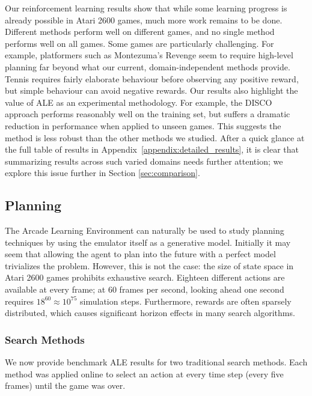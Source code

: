 \documentclass[twoside,11pt]{article}
\newcommand{\gamename}[1]{{\sc #1}}
\begin{document}
Our reinforcement learning results show that while some learning progress is already possible in Atari 2600 games, much more work remains to be done. 
Different methods perform well on different games, and no single method performs well on all games. 
Some games are particularly challenging.  For example, platformers such as \gamename{Montezuma's Revenge} seem to require high-level planning far beyond what our current, domain-independent methods provide.  \gamename{Tennis} requires fairly elaborate behaviour before observing any positive reward, but simple behaviour can avoid negative rewards.  Our results also highlight the value of ALE as an experimental methodology.
For example, the DISCO approach performs reasonably well on the training set, but suffers a dramatic reduction in performance when applied to unseen games.
This suggests the method is less robust than the other methods we studied.  After a quick glance at the full table of results in Appendix~\ref{appendix:detailed_results}, it is clear that summarizing results across such varied domains needs further attention; we explore this issue further in Section \ref{sec:comparison}. 

\subsection{Planning}
\label{sec:planning}

The Arcade Learning Environment can naturally be used to study planning techniques by using the emulator itself as a generative model. 
Initially it may seem that allowing the agent to plan into the future with a perfect model trivializes the problem.
However, this is not the case: the size of state space in Atari 2600 games prohibits exhaustive search. 
Eighteen different actions are available at every frame; at 60 frames per second, looking ahead one second requires $18^{60} \approx 10^{75}$ simulation steps.
Furthermore, rewards are often sparsely distributed, which causes significant horizon effects in many search algorithms. 

\subsubsection{Search Methods}
\label{sec:planning:methods}

We now provide benchmark ALE results for two traditional search methods.
Each method was applied online to select an action at every time step (every five frames) until the game was over.
\end{document}
